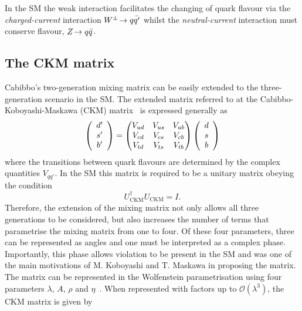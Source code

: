 In the SM the weak interaction facilitates the changing of quark flavour via the \emph{charged-current} interaction ${W^\pm}\!\rightarrow q\bar{q'}$ whilst the \emph{neutral-current} interaction must conserve flavour, ${Z}\!\rightarrow q\bar{q}$. 


\subsection{The CKM matrix}
Cabibbo's two-generation mixing matrix can be easily extended to the three-generation scenario in the SM. The extended matrix referred to at the Cabibbo-Koboyashi-Maskawa (CKM) matrix~\cite{CKM} is expressed generally as 
\begin{equation}
\left( \begin{array}{c} d' \\ s'  \\ b' \end{array} \right) = \begin{pmatrix} {\ensuremath{V_{{u}{d}}}} & {V_{{u}{s}}} & {V_{{u}{b}}} \\ {V_{{c}{d}}} & {V_{{c}{s}}} & {V_{{c}{b}}}  \\ {V_{{t}{d}}} & {V_{{t}{s}}} & {V_{{t}{b}}} \end{pmatrix} \left( \begin{array}{c} d \\ s  \\ b \end{array} \right)
\end{equation}
where the transitions between quark flavours are determined by the complex quantities $V_{qq'}$. 
In the SM this matrix is required to be a unitary matrix obeying the condition
\begin{equation}
U_{\text{CKM}}^\dag U_{\text{CKM}} = I.
\end{equation}
Therefore, the extension of the mixing matrix not only allows all three generations to be considered, but also increases the number of terms that parametrise the mixing matrix from one to four. Of these four parameters, three can be represented as angles and one must be interpreted as a complex phase. Importantly, this phase allows \CP violation to be present in the SM and was one of the main motivations of M. Koboyashi and T. Maskawa in proposing the matrix.
The matrix can be represented in the Wolfenstein parametrisation using four parameters $\lambda$, $A$, $\rho$ and $\eta$~\cite{PhysRevLett.51.1945}. When represented with factors up to $\mathcal{O}(\lambda^{3})$, the CKM matrix is given by 
